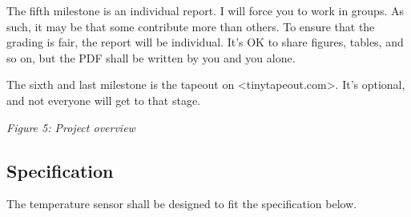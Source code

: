 The fifth milestone is an individual report. I will force you to work in
groups. As such, it may be that some contribute more than others. To
ensure that the grading is fair, the report will be individual. It's OK
to share figures, tables, and so on, but the PDF shall be written by you
and you alone.

The sixth and last milestone is the tapeout on
\textless tinytapeout.com\textgreater. It's optional, and not everyone
will get to that stage.


{
\centering
{}
}

\emph{Figure 5: Project overview }

\subsection{Specification}\label{specification}

The temperature sensor shall be designed to fit the specification below.

